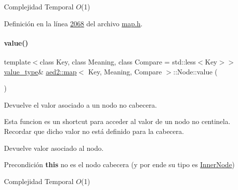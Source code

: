 \begin{DoxyDescription}
\item[Complejidad Temporal]$O$(1)
\end{DoxyDescription}

Definición en la línea \hyperlink{map_8h_source_l02068}{2068} del archivo \hyperlink{map_8h_source}{map.\+h}.

\mbox{\label{structaed2_1_1map_1_1Node_af4ada8e79dabb4849fc87de63d3970fb_af4ada8e79dabb4849fc87de63d3970fb}} 
\paragraph{\texorpdfstring{value()}{value()}\hspace{0.1cm}{\footnotesize\ttfamily [1/2]}}
{\footnotesize\ttfamily template$<$class Key, class Meaning, class Compare = std\+::less$<$\+Key$>$$>$ \\
\hyperlink{classaed2_1_1map_a719db98e0ff9a837610f76be33264680_a719db98e0ff9a837610f76be33264680}{value\+\_\+type}\& \hyperlink{classaed2_1_1map}{aed2\+::map}$<$ Key, Meaning, Compare $>$\+::Node\+::value (\begin{DoxyParamCaption}{ }\end{DoxyParamCaption})\hspace{0.3cm}{\ttfamily [inline]}}



Devuelve el valor asociado a un nodo no cabecera. 

Esta funcion es un shortcut para acceder al valor de un nodo no centinela. Recordar que dicho valor no está definido para la cabecera.

\begin{DoxyReturn}{Devuelve}
valor asociado al nodo.
\end{DoxyReturn}
\begin{DoxyPrecond}{Precondición}
{\bfseries this} no es el nodo cabecera (y por ende su tipo es \hyperlink{structaed2_1_1map_1_1InnerNode}{Inner\+Node})
\end{DoxyPrecond}

\begin{DoxyDescription}
\item[Complejidad Temporal]$O$(1)
\end{DoxyDescription}

